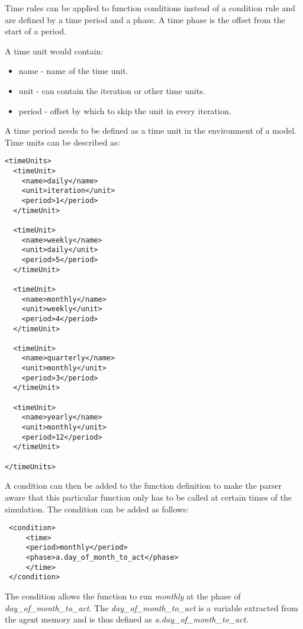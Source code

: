 Time rules can be applied to function conditions instead of a
condition rule and are defined by a time period and a phase. A time
phase is the offset from the start of a period.




A time unit would contain:
\begin{itemize}
\item name - name of the time unit.
\item unit - can contain the iteration or other time units.
\item period - offset by which to skip the unit in every iteration.
\end{itemize}

A time period needs to be defined as a time unit in the environment
of a model. Time units can be described as:

\begin{mylisting}
\begin{verbatim}
<timeUnits>
  <timeUnit>
    <name>daily</name>
    <unit>iteration</unit>
    <period>1</period>
  </timeUnit>

  <timeUnit>
    <name>weekly</name>
    <unit>daily</unit>
    <period>5</period>
  </timeUnit>

  <timeUnit>
    <name>monthly</name>
    <unit>weekly</unit>
    <period>4</period>
  </timeUnit>

  <timeUnit>
    <name>quarterly</name>
    <unit>monthly</unit>
    <period>3</period>
  </timeUnit>

  <timeUnit>
    <name>yearly</name>
    <unit>monthly</unit>
    <period>12</period>
  </timeUnit>

</timeUnits>
\end{verbatim}
\end{mylisting}

A condition can then be added to the function definition to make the
parser aware that this particular function only has to be called at
certain times of the simulation. The condition can be added as
follows:
\begin{mylisting}
\begin{verbatim}
 <condition>
     <time>
     <period>monthly</period>
     <phase>a.day_of_month_to_act</phase>
     </time>
 </condition>
\end{verbatim}
\end{mylisting}

The condition allows the function to run \emph{monthly} at the phase
of \emph{day\_of\_month\_to\_act}. The
\emph{day\_of\_month\_to\_act} is a variable extracted from the
agent memory and is thus defined as
\emph{a.day\_of\_month\_to\_act}.

